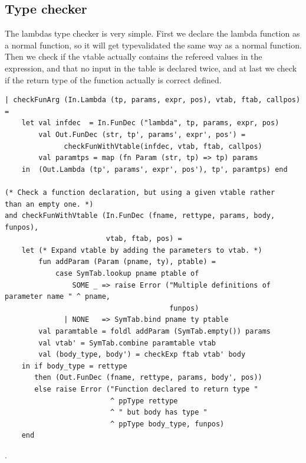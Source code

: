 \documentclass[11pt]{article}
\begin{document}
\subsection{Type checker}
The lambdas type checker is very simple. First we declare the lambda function as a normal function, so
it will get typevalidated the same way as a normal function.
Then we check if the vtable actually contains the refereed values in the expression, and that no input in
the table is declared twice, and at last we check if the return type of the function actually is correct defined.
 \begin{lstlisting}[firstnumber=361]
  | checkFunArg (In.Lambda (tp, params, expr, pos), vtab, ftab, callpos) =
    let val infdec  = In.FunDec ("lambda", tp, params, expr, pos)
        val Out.FunDec (str, tp', params', expr', pos') =
              checkFunWithVtable(infdec, vtab, ftab, callpos)
        val paramtps = map (fn Param (str, tp) => tp) params
    in  (Out.Lambda (tp', params', expr', pos'), tp', paramtps) end

(* Check a function declaration, but using a given vtable rather
than an empty one. *)
and checkFunWithVtable (In.FunDec (fname, rettype, params, body, funpos),
                        vtab, ftab, pos) =
    let (* Expand vtable by adding the parameters to vtab. *)
        fun addParam (Param (pname, ty), ptable) =
            case SymTab.lookup pname ptable of
                SOME _ => raise Error ("Multiple definitions of parameter name " ^ pname,
                                       funpos)
              | NONE   => SymTab.bind pname ty ptable
        val paramtable = foldl addParam (SymTab.empty()) params
        val vtab' = SymTab.combine paramtable vtab
        val (body_type, body') = checkExp ftab vtab' body
    in if body_type = rettype
       then (Out.FunDec (fname, rettype, params, body', pos))
       else raise Error ("Function declared to return type "
                         ^ ppType rettype
                         ^ " but body has type "
                         ^ ppType body_type, funpos)
    end

\end{lstlisting}
.
\end{document}
